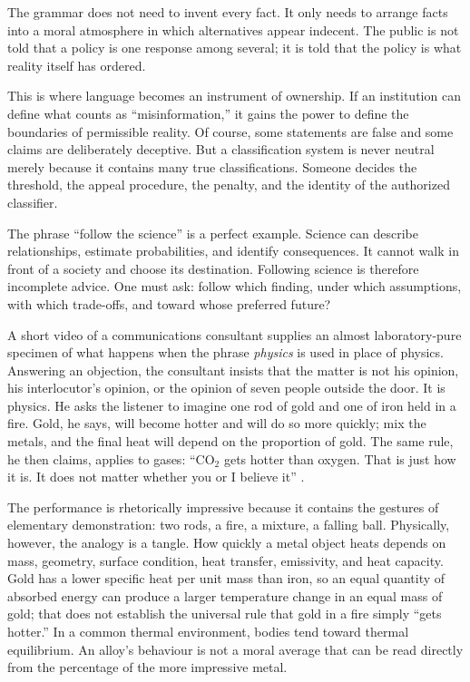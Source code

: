 ﻿\documentclass[12pt,a4paper]{book}
\begin{document}
The grammar does not need to invent every fact. It only needs to arrange facts
into a moral atmosphere in which alternatives appear indecent. The public is
not told that a policy is one response among several; it is told that the
policy is what reality itself has ordered.

This is where language becomes an instrument of ownership. If an institution
can define what counts as ``misinformation,'' it gains the power to define the
boundaries of permissible reality. Of course, some statements are false and
some claims are deliberately deceptive. But a classification system is never
neutral merely because it contains many true classifications. Someone decides
the threshold, the appeal procedure, the penalty, and the identity of the
authorized classifier.

The phrase ``follow the science'' is a perfect example. Science can describe
relationships, estimate probabilities, and identify consequences. It cannot
walk in front of a society and choose its destination. Following science is
therefore incomplete advice. One must ask: follow which finding, under which
assumptions, with which trade-offs, and toward whose preferred future?

A short video of a communications consultant supplies an almost
laboratory-pure specimen of what happens when the phrase \emph{physics} is used in place
of physics.  Answering an objection, the consultant insists that the matter is
not his opinion, his interlocutor's opinion, or the opinion of seven people
outside the door.  It is physics.  He asks the listener to imagine one rod of
gold and one of iron held in a fire.  Gold, he says, will become hotter and
will do so more quickly; mix the metals, and the final heat will depend on the
proportion of gold.  The same rule, he then claims, applies to gases:
``CO$_2$ gets hotter than oxygen.  That is just how it is.  It does not matter
whether you or I believe it'' \cite{CommunicationsConsultantCO2Video}.

The performance is rhetorically impressive because it contains the gestures
of elementary demonstration: two rods, a fire, a mixture, a falling ball.
Physically, however, the analogy is a tangle.  How quickly a metal object heats
depends on mass, geometry, surface condition, heat transfer, emissivity, and
heat capacity.  Gold has a lower specific heat per unit mass than iron, so an
equal quantity of absorbed energy can produce a larger temperature change in
an equal mass of gold; that does not establish the universal rule that gold in
a fire simply ``gets hotter.''  In a common thermal environment, bodies tend
toward thermal equilibrium.  An alloy's behaviour is not a moral average that
can be read directly from the percentage of the more impressive metal.
\end{document}
